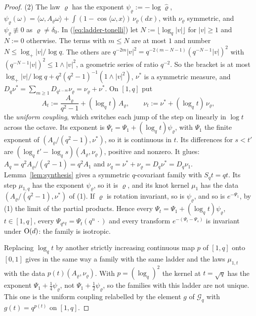 \begin{proof}
(2) The law $\varrho$ has the exponent
$\psi_\varrho := -\log\widehat\varrho$, $\psi_\varrho(\omega) = \langle\omega, A_\varrho\omega\rangle + \int(1 - \cos\langle\omega, x\rangle)\,\nu_\varrho(dx)$,
with $\nu_\varrho$ symmetric, and $\psi_\varrho \not\equiv 0$ as $\varrho \ne \delta_0$.
In (\ref{eq:ladder-tonelli}) let $N := \lfloor\log_q|v|\rfloor$ for $|v| \ge 1$ and $N := 0$
otherwise. The terms with $m \le N$ are at most $1$ and number $N \le \log_+|v|/\log q$. The others
are $q^{-2m}|v|^2 = q^{-2(m - N - 1)}(q^{-N-1}|v|)^2$ with $(q^{-N-1}|v|)^2 \le 1 \wedge |v|^2$, a
geometric series of ratio $q^{-2}$. So the bracket is at most
$\log_+|v|/\log q + q^2(q^2 - 1)^{-1}(1 \wedge |v|^2)$, $\nu^*$ is a symmetric \Levy{} measure, and
$D_q\nu^* = \sum_{m \ge 1}D_{q^{1-m}}\nu_\varrho = \nu_\varrho + \nu^*$. On $[1, q]$ put
\[
  A_t := \frac{A_\varrho}{q^2 - 1} + (\log_qt)\,A_\varrho, \qquad \nu_t := \nu^* + (\log_qt)\,\nu_\varrho,
\]
the \emph{uniform coupling}, which switches each jump of the step on linearly in $\log t$ across the
octave. Its exponent is $\Psi_t = \Psi_1 + (\log_qt)\psi_\varrho$, with $\Psi_1$ the finite exponent
of $(A_\varrho/(q^2 - 1), \nu^*)$, so it is continuous in $t$. Its differences for $s < t'$ are
$(\log_qt' - \log_qs)(A_\varrho, \nu_\varrho)$, positive and nonzero. It glues:
$A_q = q^2A_\varrho/(q^2 - 1) = q^2A_1$ and $\nu_q = \nu^* + \nu_\varrho = D_q\nu^* = D_q\nu_1$.
Lemma~\ref{lem:synthesis} gives a symmetric $q$-covariant family with $S_qt = qt$. Its step
$\mu_{1,q}$ has the exponent $\psi_\varrho$, so it is $\varrho$, and its knot kernel $\mu_1$ has the
data $(A_\varrho/(q^2 - 1), \nu^*)$ of (1). If $\varrho$ is rotation invariant, so is
$\psi_\varrho$, and so is $e^{-\Psi_1}$, by (1) the limit of the partial products. Hence every
$\Psi_t = \Psi_1 + (\log_qt)\psi_\varrho$, $t \in [1,q]$, every $\Psi_{q^nt} = \Psi_t(q^n\,\cdot)$
and every transform $e^{-(\Psi_t - \Psi_s)}$ is invariant under $\mathrm{O}(d)$: the family is isotropic.

Replacing $\log_qt$ by another strictly increasing continuous map $p$ of $[1, q]$ onto $[0, 1]$
gives in the same way a family with the same ladder and the laws $\mu_{1,t}$ with the data
$p(t)(A_\varrho, \nu_\varrho)$. With $p = (\log_q)^2$ the kernel at $t = \sqrt q$ has the exponent
$\Psi_1 + \tfrac14\psi_\varrho$, not $\Psi_1 + \tfrac12\psi_\varrho$, so the families with this
ladder are not unique. This one is the uniform coupling relabelled by the element $g$ of
$\mathcal{G}_q$ with $g(t) = q^{p(t)}$ on $[1, q]$.


\end{proof}
